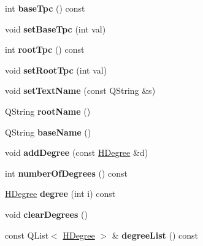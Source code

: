 \begin{DoxyCompactItemize}
int {\bfseries base\+Tpc} () const
\item 
\mbox{\label{class_ms_1_1_harmony_a9bbdf9f8eab2764f0c2ed307e4f2221a}} 
void {\bfseries set\+Base\+Tpc} (int val)
\item 
\mbox{\label{class_ms_1_1_harmony_a1a65e679252058d1dacb30e1ec753d5c}} 
int {\bfseries root\+Tpc} () const
\item 
\mbox{\label{class_ms_1_1_harmony_a5c3771c6786020d620fefba97fd72d45}} 
void {\bfseries set\+Root\+Tpc} (int val)
\item 
\mbox{\label{class_ms_1_1_harmony_ae73c8f913aa49b9e9f91d143b5d52136}} 
void {\bfseries set\+Text\+Name} (const Q\+String \&s)
\item 
\mbox{\label{class_ms_1_1_harmony_a703dac198e9e02c00f1db2808be1f049}} 
Q\+String {\bfseries root\+Name} ()
\item 
\mbox{\label{class_ms_1_1_harmony_a127d91cf83439667b70e148c5e91c102}} 
Q\+String {\bfseries base\+Name} ()
\item 
\mbox{\label{class_ms_1_1_harmony_a11d851d0017c6e0648d629522cfabf71}} 
void {\bfseries add\+Degree} (const \hyperlink{class_ms_1_1_h_degree}{H\+Degree} \&d)
\item 
\mbox{\label{class_ms_1_1_harmony_add50b958e25bb3e2d541573c71cea3ca}} 
int {\bfseries number\+Of\+Degrees} () const
\item 
\mbox{\label{class_ms_1_1_harmony_a8701c3620cf5b51333fe7d6b0ef730c2}} 
\hyperlink{class_ms_1_1_h_degree}{H\+Degree} {\bfseries degree} (int i) const
\item 
\mbox{\label{class_ms_1_1_harmony_af6af5a5a9c1fee0a2a59ca87ded551ad}} 
void {\bfseries clear\+Degrees} ()
\item 
\mbox{\label{class_ms_1_1_harmony_a1d0fc80c523716264fd0fc7375f0d11f}} 
const Q\+List$<$ \hyperlink{class_ms_1_1_h_degree}{H\+Degree} $>$ \& {\bfseries degree\+List} () const

\end{DoxyCompactItemize}
